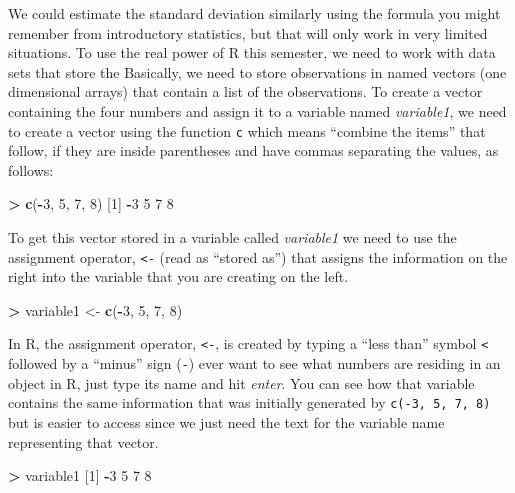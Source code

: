 \documentclass[]{book}
\newenvironment{Shaded}{\begin{snugshade}}{\end{snugshade}}
\newcommand{\KeywordTok}[1]{\textcolor[rgb]{0.13,0.29,0.53}{\textbf{#1}}}
\newcommand{\DecValTok}[1]{\textcolor[rgb]{0.00,0.00,0.81}{#1}}
\newcommand{\StringTok}[1]{\textcolor[rgb]{0.31,0.60,0.02}{#1}}
\newcommand{\OperatorTok}[1]{\textcolor[rgb]{0.81,0.36,0.00}{\textbf{#1}}}
\newcommand{\NormalTok}[1]{#1}
\begin{document}
We could estimate the standard deviation similarly using the formula you
might remember from introductory statistics, but that will only work in
very limited situations. To use the real power of R this semester, we
need to work with data sets that store the Basically, we need to store
observations in named vectors (one dimensional arrays) that contain a
list of the observations. To create a vector containing the four numbers
and assign it to a variable named \emph{variable1}, we need to create a
vector using the function \texttt{c} which means ``combine the items''
that follow, if they are inside parentheses and have commas separating
the values, as follows:

\begin{Shaded}
\begin{Highlighting}[]
\OperatorTok{>}\StringTok{ }\KeywordTok{c}\NormalTok{(}\OperatorTok{-}\DecValTok{3}\NormalTok{, }\DecValTok{5}\NormalTok{, }\DecValTok{7}\NormalTok{, }\DecValTok{8}\NormalTok{)}
\NormalTok{[}\DecValTok{1}\NormalTok{] }\OperatorTok{-}\DecValTok{3} \DecValTok{5} \DecValTok{7} \DecValTok{8}
\end{Highlighting}
\end{Shaded}

To get this vector stored in a variable called \emph{variable1} we need
to use the assignment operator, \texttt{\textless{}-} (read as ``stored
as'') that assigns the information on the right into the variable that
you are creating on the left.

\begin{Shaded}
\begin{Highlighting}[]
\OperatorTok{>}\StringTok{ }\NormalTok{variable1 <-}\StringTok{ }\KeywordTok{c}\NormalTok{(}\OperatorTok{-}\DecValTok{3}\NormalTok{, }\DecValTok{5}\NormalTok{, }\DecValTok{7}\NormalTok{, }\DecValTok{8}\NormalTok{)}
\end{Highlighting}
\end{Shaded}

In R, the assignment operator, \texttt{\textless{}-}, is created by
typing a ``less than'' symbol \texttt{\textless{}} followed by a
``minus'' sign (\texttt{-}) ever want to see what numbers are residing
in an object in R, just type its name and hit \emph{enter}. You can see
how that variable contains the same information that was initially
generated by \texttt{c(-3,\ 5,\ 7,\ 8)} but is easier to access since we
just need the text for the variable name representing that vector.

\begin{Shaded}
\begin{Highlighting}[]
\OperatorTok{>}\StringTok{ }\NormalTok{variable1}
\NormalTok{[}\DecValTok{1}\NormalTok{] }\OperatorTok{-}\DecValTok{3} \DecValTok{5} \DecValTok{7} \DecValTok{8}
\end{Highlighting}
\end{Shaded}
\end{document}
